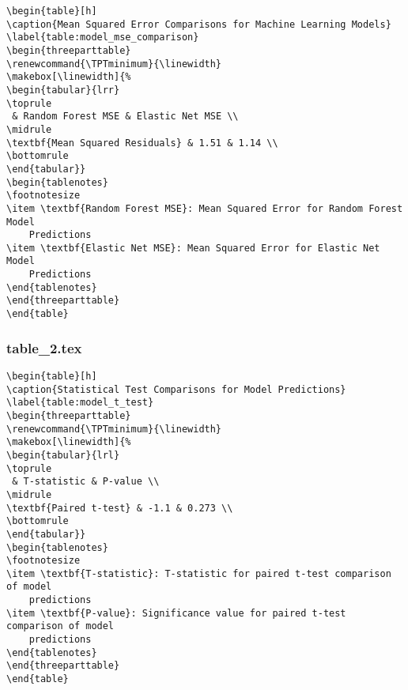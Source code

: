 \documentclass[11pt]{article}
\begin{document}
\begin{Verbatim}[tabsize=4]
\begin{table}[h]
\caption{Mean Squared Error Comparisons for Machine Learning Models}
\label{table:model_mse_comparison}
\begin{threeparttable}
\renewcommand{\TPTminimum}{\linewidth}
\makebox[\linewidth]{%
\begin{tabular}{lrr}
\toprule
 & Random Forest MSE & Elastic Net MSE \\
\midrule
\textbf{Mean Squared Residuals} & 1.51 & 1.14 \\
\bottomrule
\end{tabular}}
\begin{tablenotes}
\footnotesize
\item \textbf{Random Forest MSE}: Mean Squared Error for Random Forest Model
	Predictions
\item \textbf{Elastic Net MSE}: Mean Squared Error for Elastic Net Model
	Predictions
\end{tablenotes}
\end{threeparttable}
\end{table}

\end{Verbatim}

\subsubsection*{table\_2.tex}

\begin{Verbatim}[tabsize=4]
\begin{table}[h]
\caption{Statistical Test Comparisons for Model Predictions}
\label{table:model_t_test}
\begin{threeparttable}
\renewcommand{\TPTminimum}{\linewidth}
\makebox[\linewidth]{%
\begin{tabular}{lrl}
\toprule
 & T-statistic & P-value \\
\midrule
\textbf{Paired t-test} & -1.1 & 0.273 \\
\bottomrule
\end{tabular}}
\begin{tablenotes}
\footnotesize
\item \textbf{T-statistic}: T-statistic for paired t-test comparison of model
	predictions
\item \textbf{P-value}: Significance value for paired t-test comparison of model
	predictions
\end{tablenotes}
\end{threeparttable}
\end{table}

\end{Verbatim}
\end{document}
